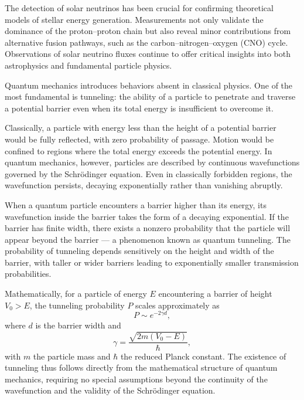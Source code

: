 The detection of solar neutrinos has been crucial for confirming theoretical models of stellar energy generation. Measurements not only validate the dominance of the proton–proton chain but also reveal minor contributions from alternative fusion pathways, such as the carbon–nitrogen–oxygen (CNO) cycle. Observations of solar neutrino fluxes continue to offer critical insights into both astrophysics and fundamental particle physics.

Quantum mechanics introduces behaviors absent in classical physics. One of the most fundamental is tunneling: the ability of a particle to penetrate and traverse a potential barrier even when its total energy is insufficient to overcome it. 

Classically, a particle with energy less than the height of a potential barrier would be fully reflected, with zero probability of passage. Motion would be confined to regions where the total energy exceeds the potential energy. In quantum mechanics, however, particles are described by continuous wavefunctions governed by the Schrödinger equation. Even in classically forbidden regions, the wavefunction persists, decaying exponentially rather than vanishing abruptly.

When a quantum particle encounters a barrier higher than its energy, its wavefunction inside the barrier takes the form of a decaying exponential. If the barrier has finite width, there exists a nonzero probability that the particle will appear beyond the barrier — a phenomenon known as quantum tunneling. The probability of tunneling depends sensitively on the height and width of the barrier, with taller or wider barriers leading to exponentially smaller transmission probabilities.

Mathematically, for a particle of energy $E$ encountering a barrier of height $V_0 > E$, the tunneling probability $P$ scales approximately as
\[
P \sim e^{-2\gamma d},
\]
where $d$ is the barrier width and
\[
\gamma = \frac{\sqrt{2m(V_0 - E)}}{\hbar},
\]
with $m$ the particle mass and $\hbar$ the reduced Planck constant. The existence of tunneling thus follows directly from the mathematical structure of quantum mechanics, requiring no special assumptions beyond the continuity of the wavefunction and the validity of the Schrödinger equation.


